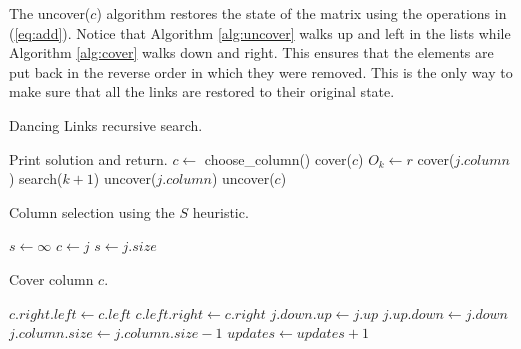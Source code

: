 The uncover($c$) algorithm restores the state of the matrix using the operations in (\ref{eq:add}).
Notice that Algorithm \ref{alg:uncover} walks up and left in the lists while Algorithm \ref{alg:cover} walks down and right.
This ensures that the elements are put back in the reverse order in which they were removed.
This is the only way to make sure that all the links are restored to their original state.

\begin{algorithm}[p]
	\caption{Dancing Links recursive search.}
	\label{alg:search}
	\begin{distribalgo}[1]
				\STATE Print solution and return.  
			\ENDIF
			\STATE $c \leftarrow$ choose\_column()
			\STATE cover($c$)
				\STATE $O_k \leftarrow r$  
					\STATE cover($j.column$)
				\ENDFOR
				\STATE search($k + 1$)
					\STATE uncover($j.column$)
				\ENDFOR
			\ENDFOR
			\STATE uncover($c$)
		\ENDPROC
	\end{distribalgo}
\end{algorithm}

\begin{algorithm}[p]
	\caption{Column selection using the $S$ heuristic.}
	\label{alg:column}
	\begin{distribalgo}[1]
			\STATE $s \leftarrow \infty$
					\STATE $c \leftarrow j$
					\STATE $s \leftarrow j.size$
				\ENDIF
			\ENDFOR
		\ENDFUNC
	\end{distribalgo}
\end{algorithm}

\begin{algorithm}[p]
	\caption{Cover column $c$.}
	\label{alg:cover}
	\begin{distribalgo}[1]
			\STATE $c.right.left \leftarrow c.left$  
			\STATE $c.left.right \leftarrow c.right$
					\STATE $j.down.up \leftarrow j.up$  
					\STATE $j.up.down \leftarrow j.down$
					\STATE $j.column.size \leftarrow j.column.size - 1$
					\STATE $updates \leftarrow updates + 1$
				\ENDFOR
			\ENDFOR
		\ENDPROC
	\end{distribalgo}
\end{algorithm}


